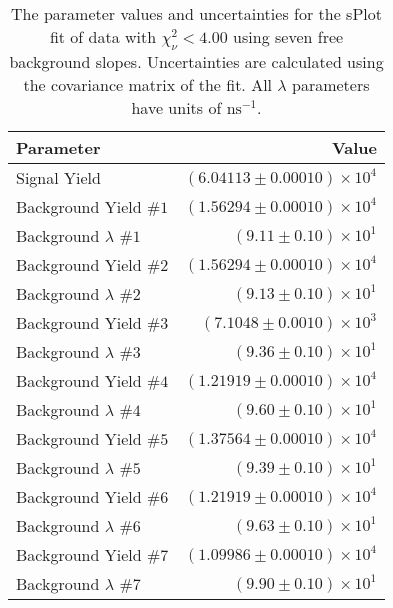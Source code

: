 
\begin{table}[ht]
    \begin{center}
        \begin{tabular}{lr}\toprule
            Parameter & Value \\\midrule
            Signal Yield & $(6.04113 \pm 0.00010) \times 10^{4}$ \\
            Background Yield $\#1$ & $(1.56294 \pm 0.00010) \times 10^{4}$ \\
            Background $\lambda$ $\#1$ & $(9.11 \pm 0.10) \times 10^{1}$ \\
            Background Yield $\#2$ & $(1.56294 \pm 0.00010) \times 10^{4}$ \\
            Background $\lambda$ $\#2$ & $(9.13 \pm 0.10) \times 10^{1}$ \\
            Background Yield $\#3$ & $(7.1048 \pm 0.0010) \times 10^{3}$ \\
            Background $\lambda$ $\#3$ & $(9.36 \pm 0.10) \times 10^{1}$ \\
            Background Yield $\#4$ & $(1.21919 \pm 0.00010) \times 10^{4}$ \\
            Background $\lambda$ $\#4$ & $(9.60 \pm 0.10) \times 10^{1}$ \\
            Background Yield $\#5$ & $(1.37564 \pm 0.00010) \times 10^{4}$ \\
            Background $\lambda$ $\#5$ & $(9.39 \pm 0.10) \times 10^{1}$ \\
            Background Yield $\#6$ & $(1.21919 \pm 0.00010) \times 10^{4}$ \\
            Background $\lambda$ $\#6$ & $(9.63 \pm 0.10) \times 10^{1}$ \\
            Background Yield $\#7$ & $(1.09986 \pm 0.00010) \times 10^{4}$ \\
            Background $\lambda$ $\#7$ & $(9.90 \pm 0.10) \times 10^{1}$ \\\bottomrule
        \end{tabular}
        \caption{The parameter values and uncertainties for the sPlot fit of data with $\chi^2_\nu < 4.00$ using seven free background slopes. Uncertainties are calculated using the covariance matrix of the fit. All $\lambda$ parameters have units of $\si{\nano\second}^{-1}$.}\label{tab:splot-fit-results-chisqdof-4.00-free-7}
    \end{center}
\end{table}
